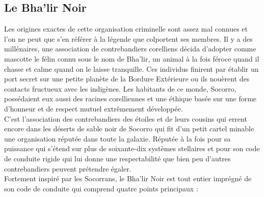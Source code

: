 \documentclass[twoside]{article}
\begin{document}
\subsection{Le Bha'lir Noir}
Les origines exactes de cette organisation criminelle sont assez mal connues et l'on ne peut que s'en référer à la légende que colportent ses membres.
Il y a des millénaires, une association de contrebandiers corelliens décida d'adopter comme mascotte le félin connu sous le nom de Bha'lir, un animal à la fois féroce quand il chasse et calme quand on le laisse tranquille. Ces individus finirent par établir un port secret sur une petite planète de la Bordure Extérieure ou ils nouèrent des contacts fructueux avec les indigènes. Les habitants de ce monde, Socorro, possédaient eux aussi des racines corelliennes et une éthique basée sur une forme d'honneur et de respect mutuel extrêmement développée.\\

C'est l'association des contrebandiers des étoiles et de leurs cousins qui errent encore dans les déserts de sable noir de Socorro qui fit d'un petit cartel minable une organisation réputée dans toute la galaxie. Réputée à la fois pour sa puissance qui s'étend sur plus de soixante-dix systèmes stellaires et pour son code de conduite rigide qui lui donne une respectabilité que bien peu d'autres contrebandiers peuvent prétendre égaler.\\

Fortement inspiré par les Socorrans, le Bha'lir Noir est tout entier imprégné de son code de conduite qui comprend quatre points principaux :
\end{document}
